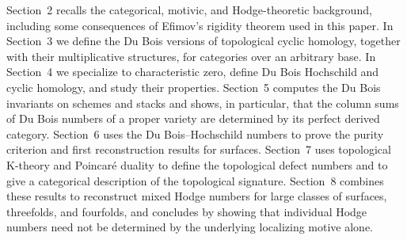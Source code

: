 \documentclass{amsart}
\theoremstyle{plain}
\theoremstyle{definition}
\begin{document}
Section~2 recalls the categorical, motivic, and Hodge-theoretic background, including some consequences of Efimov's rigidity theorem \cite{Efi25b} used in this paper. In Section~3 we define the Du Bois versions of topological cyclic homology, together with their multiplicative structures, for categories over an arbitrary base. In Section~4 we specialize to characteristic zero, define Du Bois Hochschild and cyclic homology, and study their properties. Section~5 computes the Du Bois invariants on schemes and stacks and shows, in particular, that the column sums of Du Bois numbers of a proper variety are determined by its perfect derived category.
Section~6 uses the Du Bois--Hochschild numbers to prove the purity criterion and first reconstruction results for surfaces. Section~7 uses topological K-theory and Poincar\'e duality to define the topological defect numbers and to give a categorical description of the topological signature.
Section~8 combines these results to reconstruct mixed Hodge numbers for large classes of surfaces, threefolds, and fourfolds, and concludes by showing that individual Hodge numbers need not be determined by the underlying localizing motive alone.
\end{document}
